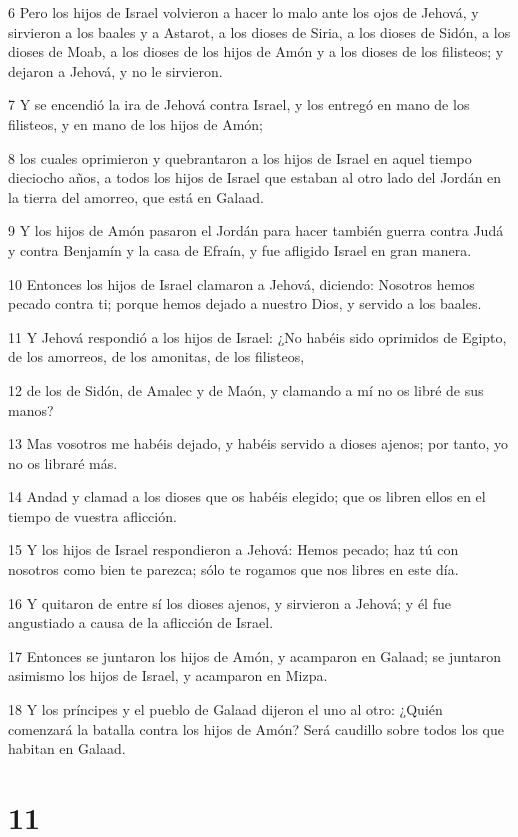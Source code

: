 \par 6 Pero los hijos de Israel volvieron a hacer lo malo ante los ojos de Jehová, y sirvieron a los baales y a Astarot, a los dioses de Siria, a los dioses de Sidón, a los dioses de Moab, a los dioses de los hijos de Amón y a los dioses de los filisteos; y dejaron a Jehová, y no le sirvieron.
\par 7 Y se encendió la ira de Jehová contra Israel, y los entregó en mano de los filisteos, y en mano de los hijos de Amón;
\par 8 los cuales oprimieron y quebrantaron a los hijos de Israel en aquel tiempo dieciocho años, a todos los hijos de Israel que estaban al otro lado del Jordán en la tierra del amorreo, que está en Galaad.
\par 9 Y los hijos de Amón pasaron el Jordán para hacer también guerra contra Judá y contra Benjamín y la casa de Efraín, y fue afligido Israel en gran manera.
\par 10 Entonces los hijos de Israel clamaron a Jehová, diciendo: Nosotros hemos pecado contra ti; porque hemos dejado a nuestro Dios, y servido a los baales.
\par 11 Y Jehová respondió a los hijos de Israel: ¿No habéis sido oprimidos de Egipto, de los amorreos, de los amonitas, de los filisteos,
\par 12 de los de Sidón, de Amalec y de Maón, y clamando a mí no os libré de sus manos?
\par 13 Mas vosotros me habéis dejado, y habéis servido a dioses ajenos; por tanto, yo no os libraré más.
\par 14 Andad y clamad a los dioses que os habéis elegido; que os libren ellos en el tiempo de vuestra aflicción.
\par 15 Y los hijos de Israel respondieron a Jehová: Hemos pecado; haz tú con nosotros como bien te parezca; sólo te rogamos que nos libres en este día.
\par 16 Y quitaron de entre sí los dioses ajenos, y sirvieron a Jehová; y él fue angustiado a causa de la aflicción de Israel.
\par 17 Entonces se juntaron los hijos de Amón, y acamparon en Galaad; se juntaron asimismo los hijos de Israel, y acamparon en Mizpa.
\par 18 Y los príncipes y el pueblo de Galaad dijeron el uno al otro: ¿Quién comenzará la batalla contra los hijos de Amón? Será caudillo sobre todos los que habitan en Galaad.

\chapter{11}

